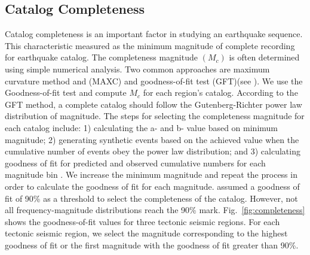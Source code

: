  
\subsection{Catalog Completeness}
\noindent
Catalog completeness is an important factor in studying an earthquake sequence. This characteristic measured as the minimum magnitude of complete recording for earthquake catalog. The completeness magnitude $(M_c)$ is often determined using simple numerical analysis. Two common approaches are maximum curvature method and (MAXC) and goodness-of-fit test (GFT)(see \citet{Wiemer2000}). We use the Goodness-of-fit test and compute $M_c$ for each region's catalog. According to the GFT method, a complete catalog should follow the Gutenberg-Richter power law distribution of magnitude. The steps for selecting the completeness magnitude for each catalog include: 1) calculating the a-  and  b-  value based on minimum magnitude; 2) generating  synthetic events based on the achieved value when the cumulative number of events obey the power law distribution; and 3) calculating goodness of fit for predicted and observed cumulative numbers for each magnitude bin  \citep{Wiemer2000}. We increase the minimum magnitude and repeat the process in order to calculate the goodness of fit for each magnitude.  \citet{Wiemer2000} assumed a goodness of fit of 90\% as a threshold to select the completeness of the catalog. However,  not all frequency-magnitude distributions reach the 90\% mark. Fig.~\ref{fig:completeness} shows the goodness-of-fit values for three tectonic seismic regions. For each tectonic seismic region, we select the magnitude corresponding to the highest goodness of fit or the first magnitude with the goodness of fit greater than 90\%.

